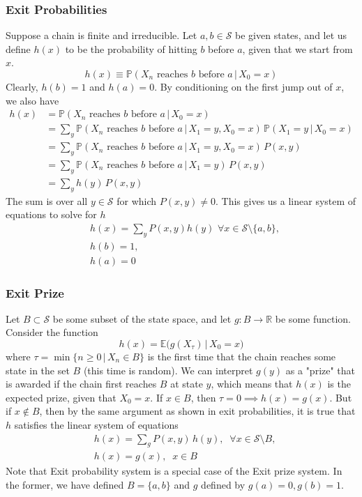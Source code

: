 \documentclass{article}
\theoremstyle{remark}
\theoremstyle{definition}
\begin{document}
\subsubsection{Exit Probabilities}
Suppose a chain is finite and irreducible. Let $a, b \in \mathcal{S}$ be given states, and let us define $h(x)$ to be the probability of hitting $b$ before $a$, given that we start from $x$. 
\[h(x) \equiv \mathbb{P} (X_n \text{ reaches } b \text{ before } a \, | \, X_0 = x)\]
Clearly, $h(b) = 1$ and $h(a) = 0$. By conditioning on the first jump out of $x$, we also have 
\begin{align*}
    h(x) & = \mathbb{P}(X_n \text{ reaches } b \text{ before } a \, | \, X_0 = x) \\
    & = \sum_{y} \mathbb{P}(X_n \text{ reaches } b \text{ before } a \, | \, X_1 = y, X_0 = x) \, \mathbb{P}(X_1 = y \,|\,X_0 = x) \\
    & = \sum_y \mathbb{P}(X_n \text{ reaches } b \text{ before } a \, | \,X_1 = y, X_0 = x) \, P(x, y) \\
    & = \sum_y \mathbb{P}(X_n \text{ reaches } b \text{ before } a \, | \,X_1 = y) \, P(x, y) \\
    & = \sum_y h(y) \, P(x, y) 
\end{align*}
The sum is over all $y \in \mathcal{S}$ for which $P(x, y) \neq 0$. This gives us a linear system of equations to solve for $h$
\begin{align*}
    & h(x) = \sum_y P(x, y) h(y) \,\, \forall x \in \mathcal{S} \setminus \{a, b\}, \\
    & h(b) = 1, \\
    & h(a) = 0
\end{align*}

\subsubsection{Exit Prize}
Let $B \subset \mathcal{S}$ be some subset of the state space, and let $g: B \longrightarrow \mathbb{R}$ be some function. Consider the function 
\[h(x) = \mathbb{E}\big( g(X_\tau) \, |\, X_0 = x \big)\]
where $\tau = \min\{ n\geq 0 \,|\, X_n \in B\}$ is the first time that the chain reaches some state in the set $B$ (this time is random). We can interpret $g(y)$ as a "prize" that is awarded if the chain first reaches $B$ at state $y$, which means that $h(x)$ is the expected prize, given that $X_0 = x$. If $x \in B$, then $\tau = 0 \implies h(x) = g(x)$. But if $x \not\in B$, then by the same argument as shown in exit probabilities, it is true that $h$ satisfies the linear system of equations
\begin{align*}
    & h(x) = \sum_g P(x, y)\,h(y), \;\; \forall x \in \mathcal{S} \setminus B, \\
    & h(x) = g(x), \;\; x \in B 
\end{align*}
Note that Exit probability system is a special case of the Exit prize system. In the former, we have defined $B = \{a, b\}$ and $g$ defined by $g(a) = 0, g(b) = 1$. 
\end{document}
